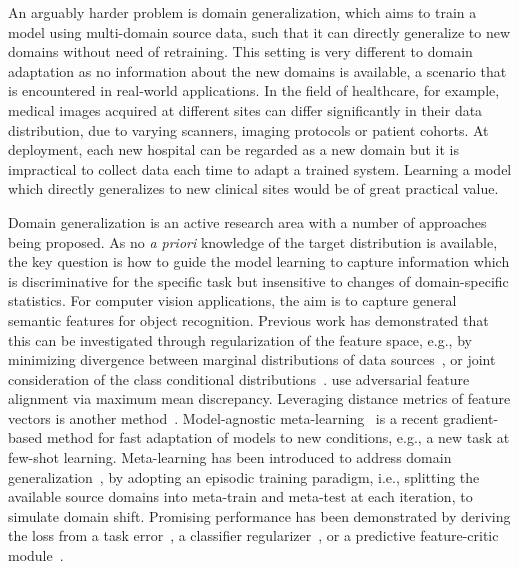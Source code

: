 \documentclass{article}
\begin{document}
An arguably harder problem is domain generalization, which aims to train a model using multi-domain source data, such that it can directly generalize to new domains without need of retraining.
This setting is very different to domain adaptation as no information about the new domains is available, a scenario that is encountered in real-world applications.
In the field of healthcare, for example, medical images acquired at different sites can differ significantly in their data distribution, due to varying scanners, imaging protocols or patient cohorts.
At deployment, each new hospital can be regarded as a new domain but it is impractical to collect data each time to adapt a trained system. Learning a model which directly generalizes to new clinical sites would be of great practical value.

Domain generalization is an active research area with a number of approaches being proposed. As no \textit{a priori} knowledge of the target distribution is available, the key question is how to guide the model learning to capture information which is discriminative for the specific task but insensitive to changes of domain-specific statistics. For computer vision applications, the aim is to capture general semantic features for object recognition.
Previous work has demonstrated that this can be investigated through regularization of the feature space, e.g., by minimizing divergence between marginal distributions of data sources~\citep{muandet2013domain}, or joint consideration of the class conditional distributions~\citep{li2018deep}. \citet{li2018domain} use adversarial feature alignment via maximum mean discrepancy. 
Leveraging distance metrics of feature vectors is another method~\citep{hsu2017learning,motiian2017unified}.
Model-agnostic meta-learning~\citep{finn2017model} is a recent gradient-based method for fast adaptation of models to new conditions, e.g., a new task at few-shot learning.
Meta-learning has been introduced to address domain generalization~\citep{balaji2018metareg,li2018learning,li2019feature}, by adopting an episodic training paradigm, i.e., splitting the available source domains into meta-train and meta-test at each iteration, to simulate domain shift.
Promising performance has been demonstrated by deriving the loss from a task error~\citep{li2018learning}, a classifier regularizer~\citep{balaji2018metareg}, or a predictive feature-critic module~\citep{li2019feature}.
\end{document}

